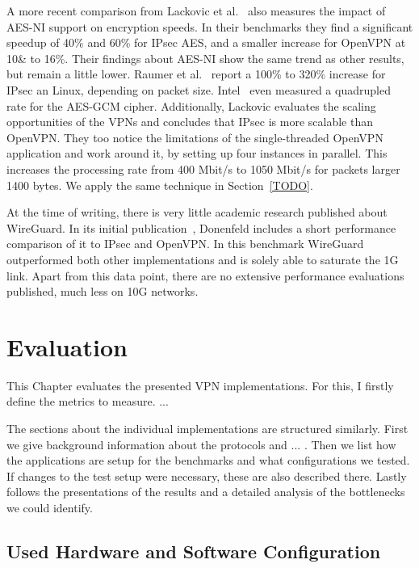 \documentclass[IN,11pt,twoside,openright,master,english]{tumthesis}
\begin{document}
A more recent comparison from Lackovic et al.~\cite{lackovic2017performance} also measures the impact of AES-NI support on encryption speeds. In their benchmarks they find a significant speedup of 40\% and 60\% for IPsec AES, and a smaller increase for OpenVPN at 10\& to 16\%. Their findings about AES-NI show the same trend as other results, but remain a little lower. Raumer et al.~\cite{raumer2016efficient} report a 100\% to 320\% increase for IPsec an Linux, depending on packet size. Intel~\cite{hoban2010using} even measured a quadrupled rate for the AES-GCM cipher.
Additionally, Lackovic evaluates the scaling opportunities of the VPNs and concludes that IPsec is more scalable than OpenVPN. They too notice the limitations of the single-threaded OpenVPN application and work around it, by setting up four instances in parallel. This increases the processing rate from 400 Mbit/s to 1050 Mbit/s for packets larger 1400 bytes. We apply the same technique in Section~\ref{TODO}.


At the time of writing, there is very little academic research published about WireGuard.
In its initial publication~\cite{donenfeld2017wireguard}, Donenfeld includes a short performance comparison of it to IPsec and OpenVPN. In this benchmark WireGuard outperformed both other implementations and is solely able to saturate the 1G link.
Apart from this data point, there are no extensive performance evaluations published, much less on 10G networks.



\chapter{Evaluation}
\label{chap:evaluation}

This Chapter evaluates the presented VPN implementations. For this, I firstly define the metrics to measure. ...

The sections about the individual implementations are structured similarly. First we give background information about the protocols and ... . Then we list how the applications are setup for the benchmarks and what configurations we tested. If changes to the test setup were necessary, these are also described there.
Lastly follows the presentations of the results and a detailed analysis of the bottlenecks we could identify. 

\section{Used Hardware and Software Configuration}
\end{document}
